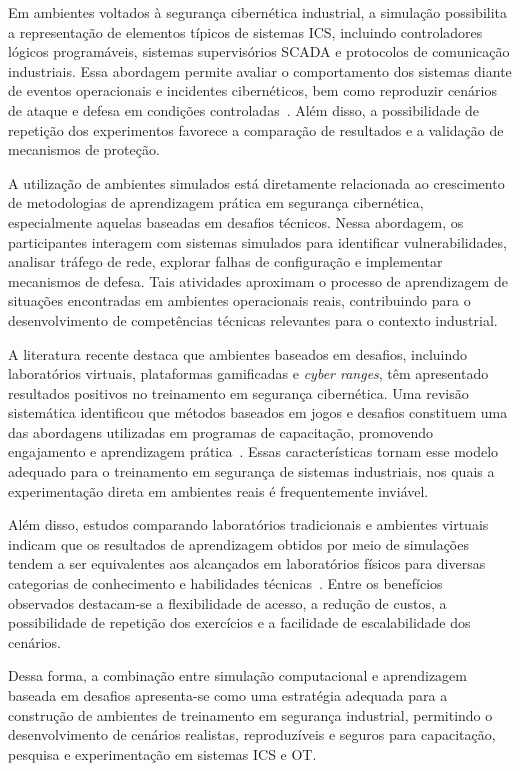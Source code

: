 \documentclass[conference]{IEEEtran}
\begin{document}
Em ambientes voltados à segurança cibernética industrial, a simulação possibilita a representação de elementos típicos de sistemas ICS, incluindo controladores lógicos programáveis, sistemas supervisórios SCADA e protocolos de comunicação industriais. Essa abordagem permite avaliar o comportamento dos sistemas diante de eventos operacionais e incidentes cibernéticos, bem como reproduzir cenários de ataque e defesa em condições controladas~\cite{s21155189}. Além disso, a possibilidade de repetição dos experimentos favorece a comparação de resultados e a validação de mecanismos de proteção.

A utilização de ambientes simulados está diretamente relacionada ao crescimento de metodologias de aprendizagem prática em segurança cibernética, especialmente aquelas baseadas em desafios técnicos. Nessa abordagem, os participantes interagem com sistemas simulados para identificar vulnerabilidades, analisar tráfego de rede, explorar falhas de configuração e implementar mecanismos de defesa. Tais atividades aproximam o processo de aprendizagem de situações encontradas em ambientes operacionais reais, contribuindo para o desenvolvimento de competências técnicas relevantes para o contexto industrial.

A literatura recente destaca que ambientes baseados em desafios, incluindo laboratórios virtuais, plataformas gamificadas e \textit{cyber ranges}, têm apresentado resultados positivos no treinamento em segurança cibernética. Uma revisão sistemática identificou que métodos baseados em jogos e desafios constituem uma das abordagens utilizadas em programas de capacitação, promovendo engajamento e aprendizagem prática~\cite{PRUMMER2024103585}. Essas características tornam esse modelo adequado para o treinamento em segurança de sistemas industriais, nos quais a experimentação direta em ambientes reais é frequentemente inviável.

Além disso, estudos comparando laboratórios tradicionais e ambientes virtuais indicam que os resultados de aprendizagem obtidos por meio de simulações tendem a ser equivalentes aos alcançados em laboratórios físicos para diversas categorias de conhecimento e habilidades técnicas~\cite{BRINSON2015218}. Entre os benefícios observados destacam-se a flexibilidade de acesso, a redução de custos, a possibilidade de repetição dos exercícios e a facilidade de escalabilidade dos cenários.

Dessa forma, a combinação entre simulação computacional e aprendizagem baseada em desafios apresenta-se como uma estratégia adequada para a construção de ambientes de treinamento em segurança industrial, permitindo o desenvolvimento de cenários realistas, reproduzíveis e seguros para capacitação, pesquisa e experimentação em sistemas ICS e OT.
\end{document}
